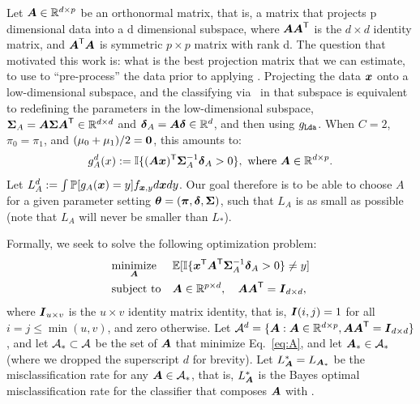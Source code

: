\documentclass[10pt]{article}
\begin{document}
Let $\boldsymbol{A} \in \mathbb{R}^{d \times p}$ be an orthonormal matrix, that is, a matrix that projects p dimensional data into a d dimensional subspace, where $\boldsymbol{A}\boldsymbol{A}^{\mathsf{T}}$ is the $d \times d$ identity matrix, and $\boldsymbol{A}^{\mathsf{T}} \boldsymbol{A}$ is symmetric $p \times p$ matrix with rank d.   The question that motivated this work is: what is the best projection matrix that we can estimate, to use to ``pre-process'' the data prior to applying \Lda.  
Projecting the data $\boldsymbol{x}$ onto a low-dimensional subspace, and the classifying via \Lda~in that subspace is equivalent to redefining the parameters in the low-dimensional subspace, 
$\boldsymbol{\Sigma}_A=\boldsymbol{A} \boldsymbol{\Sigma} \boldsymbol{A}^{\mathsf{T}} \in \mathbb{R}^{d \times d}$ and $\boldsymbol{\delta}_A = \boldsymbol{A} \boldsymbol{\delta} \in \mathbb{R}^d$, and then using $g_{{\sc \texttt{Lda}}}$.  When $C=2$, $\pi_0=\pi_1$, and $(\mu_0+\mu_1)/2=\boldsymbol{0}$, this amounts to:
\begin{align} \label{eq:g_A}
g^d_A(x) := \mathbb{I} \{ (\boldsymbol{A} \boldsymbol{x})^{\mathsf{T}} \boldsymbol{\Sigma}^{-1}_A \boldsymbol{\delta}_A > 0\}, \text{ where } \boldsymbol{A} \in \mathbb{R}^{d \times p}.
\end{align}
Let $L^d_A :=\int \mathbb{P}[g_A(\boldsymbol{x})=y] f_{\boldsymbol{x},y} d\boldsymbol{x} dy$.
Our goal therefore is to be able to choose $A$ for a given parameter setting $\boldsymbol{\theta}=(\boldsymbol{\pi}, \boldsymbol{\delta},\boldsymbol{\Sigma})$, such that $L_A$ is as small as possible (note that $L_A$ will never be smaller than $L_*$).  

Formally, we seek to solve the following optimization problem:
\begin{equation} \label{eq:A}
\begin{aligned}
& \underset{\boldsymbol{A}}{\text{minimize}}
& & \mathbb{E} [ \mathbb{I} \{ \boldsymbol{x}^{\mathsf{T}} \boldsymbol{A}^{\mathsf{T}} \boldsymbol{\Sigma}^{-1}_A \boldsymbol{\delta}_A > 0\} \neq y] \\
& \text{subject to} & & \boldsymbol{A} \in \mathbb{R}^{p \times d}, \quad \boldsymbol{A} \boldsymbol{A}^{\mathsf{T}} = \boldsymbol{I}_{d \times d},
\end{aligned}
\end{equation}
where $\boldsymbol{I}_{u \times v}$ is the $u \times v$ identity matrix identity, that is, $\boldsymbol{I}(i,j)=1$ for all $i=j \leq \min(u,v)$, and zero otherwise. 
Let $\mathcal{A}^d=\{\boldsymbol{A} : \boldsymbol{A} \in \mathbb{R}^{d \times p}, \boldsymbol{A} \boldsymbol{A}^{\mathsf{T}} = \boldsymbol{I}_{d \times d}\}$, and let $\mathcal{A}_* \subset \mathcal{A}$ be the set of $\boldsymbol{A}$  that minimize Eq.~\eqref{eq:A}, and let $\boldsymbol{A}_* \in \mathcal{A}_*$ (where we dropped the superscript $d$ for brevity).   Let $L_{\boldsymbol{A}}^*=L_{\boldsymbol{A}_*}$ be the misclassification rate for any $\boldsymbol{A} \in \mathcal{A}_*$, that is, $L_{\boldsymbol{A}}^*$ is the Bayes optimal misclassification rate for the classifier that composes $\boldsymbol{A}$ with \Lda.
\end{document}
